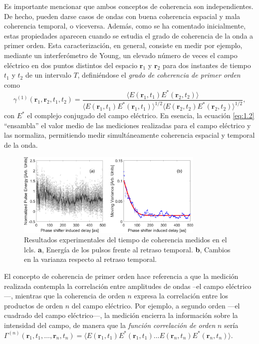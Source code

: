 Es importante mencionar que ambos conceptos de coherencia son independientes. De hecho, pueden darse casos de ondas con buena coherencia espacial y mala coherencia temporal, o viceversa. Además, como se ha comentado inicialmente, estas propiedades aparecen cuando se estudia el grado de coherencia de la onda a primer orden. Esta caracterización, en general, consiste en medir por ejemplo, mediante un interferómetro de Young, un elevado número de veces el campo eléctrico en dos puntos distintos del espacio $\symbf{r}_1$ y $\symbf{r}_2$ para dos instantes de tiempo $t_1$ y $t_2$ de un intervalo $T$, definiéndose el \emph{grado de coherencia de primer orden} como
\begin{equation}\label{eq:1.2}
    \gamma^{(1)}(\symbf{r}_1,\symbf{r}_2,t_1,t_2) = \dfrac{\langle E(\symbf{r}_1,t_1)E^*(\symbf{r}_2,t_2)\rangle}{\langle E(\symbf{r}_1,t_1)E^*(\symbf{r}_1,t_1) \rangle^{1/2} \langle E(\symbf{r}_2,t_2)E^*(\symbf{r}_2,t_2) \rangle^{1/2}},
\end{equation}
con $E^*$ el complejo conjugado del campo eléctrico. En esencia, la ecuación \eqref{eq:1.2} \enquote{ensambla} el valor medio de las mediciones realizadas para el campo eléctrico y las normaliza, permitiendo medir simultáneamente coherencia espacial y temporal de la onda.

\begin{figure}[ht!]
    \centering
    \includegraphics[width=0.8\textwidth]{Figuras/ch1_coher.png}
    \caption{Resultados experimentales del tiempo de coherencia medidos en el \acrshort{lcls}\autocite{Zhou2020AttosecondLaser}. \textbf{a}, Energía de los pulsos frente al retraso temporal. \textbf{b}, Cambios en la varianza respecto al retraso temporal.}
    \label{fig:ch1_coher}
\end{figure}

El concepto de coherencia de primer orden hace referencia a que la medición realizada contempla la correlación entre amplitudes de ondas --el campo eléctrico---, mientras que la coherencia de orden $n$ expresa la correlación entre los productos de orden $n$ del campo eléctrico. Por ejemplo, a segundo orden ---el cuadrado del campo eléctrico---, la medición encierra la información sobre la intensidad del campo, de manera que la \emph{función correlación de orden} $n$ sería $\Gamma^{(n)}(\symbf{r}_1,t_1,\ldots,\symbf{r}_n,t_n) = \langle E(\symbf{r}_1,t_1)E^*(\symbf{r}_1,t_1)\ldots E(\symbf{r}_n,t_n)E^*(\symbf{r}_n,t_n)\rangle$.

